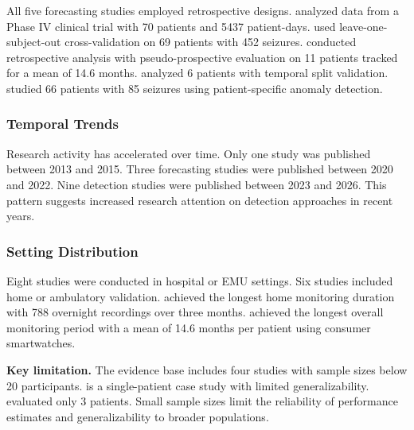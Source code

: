 All five forecasting studies employed retrospective designs. \textcite{vielufSeizureMonitoringCombined2025} analyzed data from a Phase IV clinical trial with 70 patients and 5437 patient-days. \textcite{meiselMachineLearningWristband2020} used leave-one-subject-out cross-validation on 69 patients with 452 seizures. \textcite{stirlingForecastingSeizureLikelihood2021} conducted retrospective analysis with pseudo-prospective evaluation on 11 patients tracked for a mean of 14.6 months. \textcite{nasseriAmbulatorySeizureForecasting2021} analyzed 6 patients with temporal split validation. \textcite{odeDevelopmentEpilepticSeizure2023} studied 66 patients with 85 seizures using patient-specific anomaly detection.

\subsubsection{Temporal Trends}

Research activity has accelerated over time. Only one study was published between 2013 and 2015. Three forecasting studies were published between 2020 and 2022. Nine detection studies were published between 2023 and 2026. This pattern suggests increased research attention on detection approaches in recent years.

\subsubsection{Setting Distribution}

Eight studies were conducted in hospital or EMU settings. Six studies included home or ambulatory validation. \textcite{dongTwoLayerEnsembleMethod2022} achieved the longest home monitoring duration with 788 overnight recordings over three months. \textcite{stirlingForecastingSeizureLikelihood2021} achieved the longest overall monitoring period with a mean of 14.6 months per patient using consumer smartwatches.

\textbf{Key limitation.} The evidence base includes four studies with sample sizes below 20 participants. \textcite{singhRathoreWearableBasedEpileptic2024} is a single-patient case study with limited generalizability. \textcite{borujenyDetectionEpilepticSeizure2013} evaluated only 3 patients. Small sample sizes limit the reliability of performance estimates and generalizability to broader populations.
